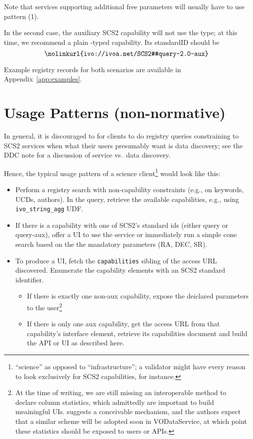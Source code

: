 \documentclass[11pt,a4paper]{ivoa}
\begin{document}
Note that services supporting additional free parameters will usually
have to use pattern (1).

In the second case, the auxiliary SCS2 capability will not use the
 type; at this time, we recommend a plain
-typed capability.  Its standardID should be
$$
\hbox{\nolinkurl{ivo://ivoa.net/SCS2#query-2.0-aux}}
$$

Example registry records for both scenarios are available in
Appendix~\ref{app:examples}.


\appendix
\section{Usage Patterns (non-normative)}

In general, it is discouraged to for clients to do registry queries
constraining to SCS2 services when what their users presumably want is
data discovery; see the DDC note \citet{2019ivoa.spec.0520D} for a
discussion of service vs.~data discovery.

Hence, the typical usage pattern of a science
client\footnote{``science'' as opposed to ``infrastructure''; a
validator might have every reason to look exclusively for SCS2
capabilities, for instance.} would look like this:

\begin{itemize}
\item Perform a registry search with non-capability constraints (e.g.,
on keywords, UCDs, authors).  In the query, retrieve the available
capabilities, e.g., using \verb|ivo_string_agg| UDF.

\item If there is a capability with one of SCS2's standard ids (either
query or query-aux), offer a UI to use the service or immediately run a
simple cone search based on the the mandatory parameters (RA, DEC, SR).

\item To produce a UI, fetch the \texttt{capabilities} sibling of the
access URL discovered.  Enumerate the capability elements with an SCS2
standard identifier.

\begin{itemize}
\item If there is exactly one non-aux capability, expose
the deiclared parameters to the user\footnote{At the time of writing, we
are still missing an interoperable method to declare column statistics,
which admittedly are important to build meainingful UIs.
\citet{note:colstatnote} suggests a conceivable mechanism, and the
authors expect that a similar scheme will be adopted soon in
VODataService, at which point these statistics should be exposed to
users or APIs.}

\item If there is only one aux capability, get the access URL from that
capability's interface element, retrieve its capabilities document and
build the API or UI as described here.
\end{itemize}
\end{itemize}
\end{document}
